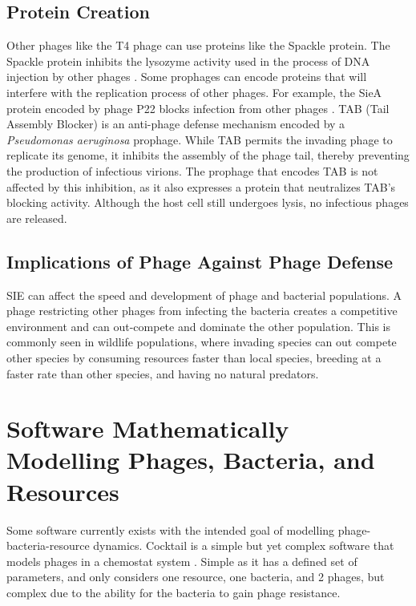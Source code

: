 \subsection{Protein Creation}
Other phages like the T4 phage can use proteins like the Spackle protein. 
The Spackle protein inhibits the lysozyme activity used in the process of DNA injection by other phages \cite{bucherPhageMachineSIEence2024, kanamaruStructureFunctionT42020}. 
Some prophages can encode proteins that will interfere with the replication process of other phages. 
For example, the SieA protein encoded by phage P22 blocks infection from other phages \cite{leavittBacteriophageP22SieAmediated2024}. \newline
TAB (Tail Assembly Blocker) is an anti-phage defense mechanism encoded by a \textit{Pseudomonas aeruginosa} prophage. 
While TAB permits the invading phage to replicate its genome, it inhibits the assembly of the phage tail, thereby preventing the production of infectious virions. 
The prophage that encodes TAB is not affected by this inhibition, as it also expresses a protein that neutralizes TAB's blocking activity. 
Although the host cell still undergoes lysis, no infectious phages are released.

\subsection{Implications of Phage Against Phage Defense}
SIE can affect the speed and development of phage and bacterial populations. A phage restricting other phages from infecting the bacteria creates a competitive environment and can out-compete and dominate the other population. 
This is commonly seen in wildlife populations, where invading species can out compete other species by consuming resources faster than local species, breeding at a faster rate than other species, and having no natural predators. 

\section{Software Mathematically Modelling Phages, Bacteria, and Resources}
Some software currently exists with the intended goal of modelling phage-bacteria-resource dynamics. 
Cocktail is a simple but yet complex software that models phages in a chemostat system \cite{nilssonCocktailComputerProgram2022}. 
Simple as it has a defined set of parameters, and only considers one resource, one bacteria, and 2 phages, but complex due to the ability for the bacteria to gain phage resistance. 

